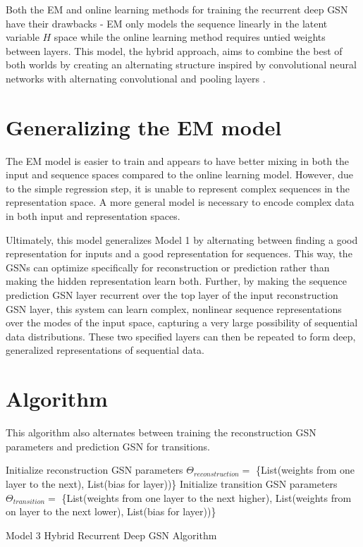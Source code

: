 Both the EM and online learning methods for training the recurrent deep GSN have their drawbacks - EM only models the sequence linearly in the latent variable \(H\) space while the online learning method requires untied weights between layers. This model, the hybrid approach, aims to combine the best of both worlds by creating an alternating structure inspired by convolutional neural networks with alternating convolutional and pooling layers \cite{lenet5}.

\section{Generalizing the EM model}
The EM model is easier to train and appears to have better mixing in both the input and sequence spaces compared to the online learning model. However, due to the simple regression step, it is unable to represent complex sequences in the representation space. A more general model is necessary to encode complex data in both input and representation spaces.

Ultimately, this model generalizes Model 1 by alternating between finding a good representation for inputs and a good representation for sequences. This way, the GSNs can optimize specifically for reconstruction or prediction rather than making the hidden representation learn both. Further, by making the sequence prediction GSN layer recurrent over the top layer of the input reconstruction GSN layer, this system can learn complex, nonlinear sequence representations over the modes of the input space, capturing a very large possibility of sequential data distributions. These two specified layers can then be repeated to form deep, generalized representations of sequential data.


\section{Algorithm}
This algorithm also alternates between training the reconstruction GSN parameters and prediction GSN for transitions.
 \begin{algorithm}[h!]
	Initialize reconstruction GSN parameters \(\Theta_{reconstruction} = \) \{List(weights from one layer to the next), List(bias for layer))\}\;
	Initialize transition GSN parameters \(\Theta_{transition} = \) \{List(weights from one layer to the next higher), List(weights from on layer to the next lower), List(bias for layer))\}\;
	\caption{ Model 3 Hybrid  Recurrent Deep GSN Algorithm }
\end{algorithm}


